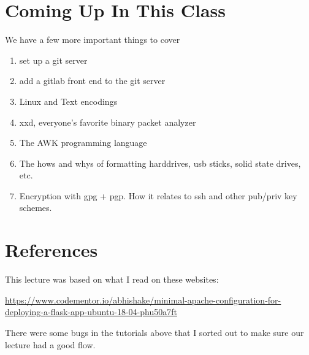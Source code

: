 \documentclass[10pt]{article}
\begin{document}
\section{Coming Up In This Class}

We have a few more important things to cover
\begin{enumerate}
\item set up a git server
\item add a gitlab front end to the git server
\item Linux and Text encodings
\item xxd, everyone's favorite binary packet analyzer
\item The AWK programming language
\item The hows and whys of formatting harddrives, usb sticks, solid state drives, etc.
\item Encryption with gpg + pgp. How it relates to ssh and other pub/priv key schemes.
\end{enumerate}

\section{References}
This lecture was based on what I read  on these websites:

\url{https://www.codementor.io/abhishake/minimal-apache-configuration-for-deploying-a-flask-app-ubuntu-18-04-phu50a7ft}



There were some bugs in the tutorials above that I sorted out to make sure our lecture had a good flow.
\end{document}
